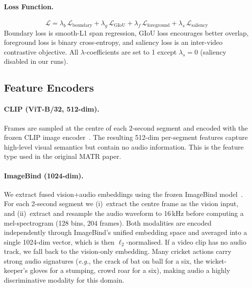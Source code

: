 \documentclass[10pt,twocolumn]{article}
\begin{document}
\paragraph{Loss Function.}
\begin{equation}
  \mathcal{L} = \lambda_b\,\mathcal{L}_{\text{boundary}}
              + \lambda_g\,\mathcal{L}_{\text{GIoU}}
              + \lambda_f\,\mathcal{L}_{\text{foreground}}
              + \lambda_s\,\mathcal{L}_{\text{saliency}}
\end{equation}
Boundary loss is smooth-L1 span regression, GIoU loss encourages better
overlap, foreground loss is binary cross-entropy, and saliency loss is an
inter-video contrastive objective.
All $\lambda$-coefficients are set to 1 except $\lambda_s{=}0$
(saliency disabled in our runs).

\subsection{Feature Encoders}

\paragraph{CLIP (ViT-B/32, 512-dim).}
Frames are sampled at the centre of each 2-second segment and encoded with the
frozen CLIP image encoder~\cite{radford2021clip}. The resulting 512-dim
per-segment features capture high-level visual semantics but contain no audio
information. This is the feature type used in the original MATR paper.

\paragraph{ImageBind (1024-dim).}
We extract fused vision+audio embeddings using the frozen ImageBind
model~\cite{girdhar2023imagebind}. For each 2-second segment we
(i)~extract the centre frame as the vision input, and (ii)~extract and
resample the audio waveform to 16\,kHz before computing a mel-spectrogram
(128 bins, 204 frames). Both modalities are encoded independently through
ImageBind's unified embedding space and averaged into a single 1024-dim
vector, which is then $\ell_2$-normalised. If a video clip has no audio
track, we fall back to the vision-only embedding. Many cricket
actions carry strong audio signatures (\textit{e.g.}, the crack of bat on ball
for a six, the wicket-keeper's gloves for a stumping, crowd roar for a six),
making audio a highly discriminative modality for this domain.
\end{document}
